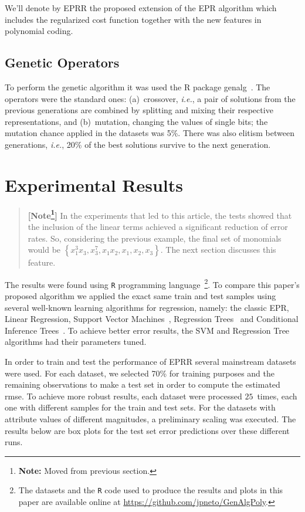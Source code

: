 \documentclass[preprint,authoryear,12pt]{elsarticle}
\newcommand{\note}[1]{\textbf{\small [Note\footnote{\textbf{Note:} #1}]}}
\begin{document}
We'll denote by \ac{EPRR} the proposed extension of the EPR algorithm which includes the regularized cost function together with the new features in polynomial coding.

\subsection{Genetic Operators}

To perform the genetic algorithm it was used the R package genalg~\citep{Willighagen:2012aa}. The operators were the standard ones: (a)~crossover, \emph{i.e.}, a pair of solutions from the previous generations are combined by splitting and mixing their respective representations, and (b)~mutation, changing the values of single bits; the mutation chance applied in the datasets was 5\%. There was also elitism between generations, \emph{i.e.}, 20\% of the best solutions survive to the next generation.

\section{Experimental Results}

\begin{quotation}
\note{Moved from previous section.} In the experiments that led to this article, the tests showed that the inclusion of the linear terms achieved a significant reduction of error rates. So, considering the previous example, the final set of monomials would be $\left\lbrace x_1^3 x_3, x_3^7, x_1 x_2, x_1, x_2, x_3 \right\rbrace$. The next section discusses this feature.
\end{quotation}

The results were found using \texttt{R} programming language~\citep{R-Core-Team:2013aa}\footnote{The datasets and the \texttt{R} code used to produce the results and plots in this paper are available online at \url{https://github.com/jpneto/GenAlgPoly}.}. To compare this paper's proposed algorithm we applied the exact same train and test samples using several well-known learning algorithms for regression, namely: the classic \ac{EPR}, Linear Regression, Support Vector Machines~\citep{Meyer:2012aa}, Regression Trees~\citep{Therneau:2013aa} and Conditional Inference Trees~\citep{Hothorn:2006aa,Strobl:2007aa,Strobl:2008aa}. To achieve better error results, the \ac{SVM} and Regression Tree algorithms had their parameters tuned.

In order to train and test the performance of \ac{EPRR} several mainstream datasets were used. For each dataset, we selected 70\% for training purposes and the remaining observations to make a test set in order to compute the estimated \ac{rmse}. To achieve more robust results, each dataset were processed $25$~times, each one with different samples for the train and test sets. For the datasets with attribute values of different magnitudes, a preliminary scaling was executed. The results below are box plots for the test set error predictions over these different runs.
\end{document}
